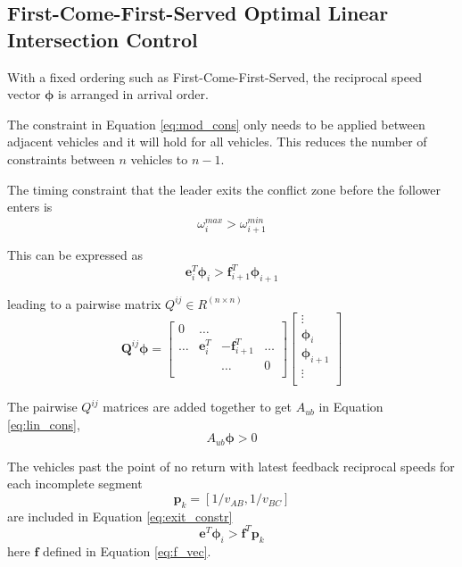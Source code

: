\subsection{First-Come-First-Served Optimal Linear Intersection Control}
With a fixed ordering such as First-Come-First-Served, the reciprocal speed vector $\bm{\phi}$ is arranged in arrival order. 

The constraint in Equation \ref{eq:mod_cons} only needs to be applied between adjacent vehicles and it will hold for all vehicles. This reduces the number of constraints between $n$ vehicles to $n-1$.

The timing constraint that the leader exits the conflict zone before the follower enters is 
\begin{equation}
\omega_i^{max} > \omega_{i+1}^{min}
\end{equation}

This can be expressed as 
\begin{equation}
\bm{e}_i^T\bm{\phi}_i > \bm{f}_{i+1}^T\bm{\phi}_{i+1}
\end{equation}

leading to a pairwise matrix $Q^{ij} \in R^{(n \times n)}$
\begin{equation}
\bm{Q}^{ij}\bm{\phi} = \left[ \begin{array}{cccc}
0 & \hdots &&\\
\hdots & \bm{e}_i^T & -\bm{f}_{i+1}^T & \hdots \\
&&\hdots & 0\\
\end{array} \right]
\left[ \begin{array}{c}
\vdots\\
\bm{\phi}_i \\
\bm{\phi}_{i+1} \\
\vdots\\
\end{array} \right]
\end{equation}

The pairwise $Q^{ij}$ matrices are added together to get $A_{ub}$ in Equation \ref{eq:lin_cons}, 
\begin{equation}
\label{eq:lin_cons}
A_{ub}\bm{\phi} > 0
\end{equation}

The vehicles past the point of no return with latest feedback reciprocal speeds for each incomplete segment
\begin{equation}
\bm{p}_k  = [1/v_{AB}, 1/v_{BC}]
\end{equation}
are included in Equation \ref{eq:exit_constr} 
\begin{equation}
\bm{e}^T\bm{\phi}_i >  \bm{f}^T\bm{p}_k
\label{eq:exit_constr}
\end{equation} 
here $\bm{f}$ defined in Equation \ref{eq:f_vec}.
 
